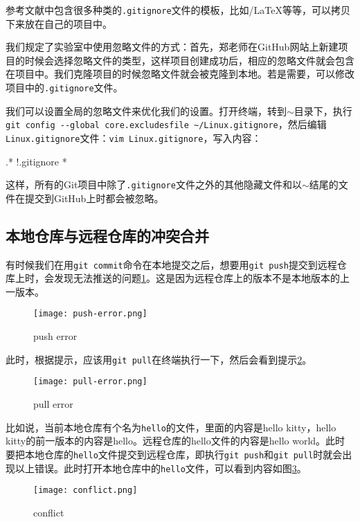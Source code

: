 \documentclass[a4paper,12pt]{article}
\begin{document}
参考文献\cite{7:misc}中包含很多种类的\verb|.gitignore|文件的模板，比如/LaTeX等等，可以拷贝下来放在自己的项目中。

我们规定了实验室中使用忽略文件的方式：首先，郑老师在GitHub网站上新建项目的时候会选择忽略文件的类型，这样项目创建成功后，相应的忽略文件就会包含在项目中。我们克隆项目的时候忽略文件就会被克隆到本地。若是需要，可以修改项目中的\verb|.gitignore|文件。

我们可以设置全局的忽略文件来优化我们的设置。打开终端，转到$\sim$目录下，执行\lstinline|git config --global core.excludesfile ~/Linux.gitignore|，然后编辑\verb|Linux.gitignore|文件：\lstinline|vim Linux.gitignore|，写入内容：
\begin{plaintext}
.*
!.gitignore
*~
\end{plaintext}
这样，所有的Git项目中除了\verb|.gitignore|文件之外的其他隐藏文件和以$\sim$结尾的文件在提交到GitHub上时都会被忽略。

\subsection{本地仓库与远程仓库的冲突合并}

有时候我们在用\lstinline|git commit|命令在本地提交之后，想要用\lstinline|git push|提交到远程仓库上时，会发现无法推送的问题\ref{fig:6}。这是因为远程仓库上的版本不是本地版本的上一版本。

\begin{figure}[!htb] %
\centering
\texttt{[image: push-error.png]}
\caption{push error}\label{fig:6}
\end{figure}

此时，根据提示，应该用\lstinline|git pull|在终端执行一下，然后会看到提示\ref{fig:7}。

\begin{figure}[!htb] %
\centering
\texttt{[image: pull-error.png]}
\caption{pull error}\label{fig:7}
\end{figure}

比如说，当前本地仓库有个名为\verb|hello|的文件，里面的内容是hello kitty，hello kitty的前一版本的内容是hello。远程仓库的hello文件的内容是hello world。此时要把本地仓库的\verb|hello|文件提交到远程仓库，即执行\lstinline|git push|和\lstinline|git pull|时就会出现以上错误。此时打开本地仓库中的\verb|hello|文件，可以看到内容如图\ref{fig:8}。

\begin{figure}[!htb] %
\centering
\texttt{[image: conflict.png]}
\caption{conflict}\label{fig:8}
\end{figure}
\end{document}
